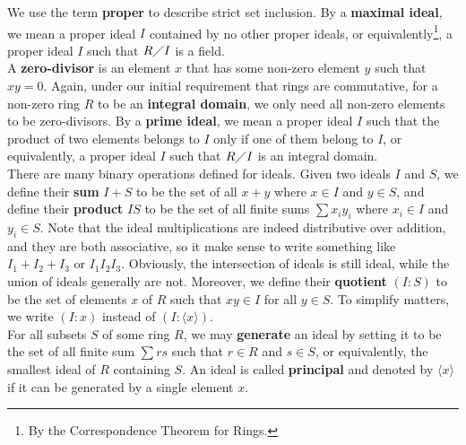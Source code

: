 \documentclass{report}
\begin{document}
We use the term \textbf{proper} to describe strict set inclusion. By a \textbf{maximal ideal}, we mean a proper ideal $I$ contained by no other proper ideals, or equivalently\footnote{By the Correspondence Theorem for Rings.}, a proper ideal $I$ such that $R\diagup I$ is a field.\\

A \textbf{zero-divisor} is an element $x$ that has some non-zero element $y$ such that  $xy=0$. Again, under our initial requirement that rings are commutative, for a non-zero ring $R$ to be an  \textbf{integral domain}, we only need all non-zero elements to be zero-divisors. By a \textbf{prime ideal}, we mean a proper ideal $I$ such that the product of two elements belongs to $I$ only if one of them belong to $I$, or equivalently, a proper ideal $I$ such that $R\diagup I$ is an integral domain.  \\


There are many binary operations defined for ideals.  Given two ideals $I$ and $S$, we define their \textbf{sum} $I+S$ to be the set of all  $x+y$ where  $x\in I$ and $y \in S$, and define their \textbf{product} $IS$ to be the set of all finite sums $\sum x_iy_i$ where  $x_i \in I$ and $y_i\in S$. Note that the ideal multiplications are indeed distributive over addition, and they are both associative, so it make sense to write something like $I_1+I_2+I_3$ or $I_1I_2I_3$. Obviously, the intersection of ideals is still ideal, while the union of ideals generally are not. Moreover, we define their \textbf{quotient} $(I:S)$ to be the set of elements $x$ of $R$ such that $xy \in I$ for all $y \in S$. To simplify matters, we write $(I:x)$ instead of $(I:\langle x\rangle )$. \\ 

For all subsets $S$ of some ring $R$, we may \textbf{generate} an ideal by setting it to be the set of all finite sum  $\sum rs$ such that $r\in R$ and $s \in S$, or equivalently, the smallest ideal of $R$ containing $S$. An ideal is called \textbf{principal} and denoted by $\langle x\rangle $ if it can be generated by a single element $x$. \\
\end{document}
